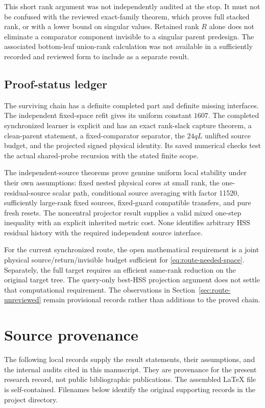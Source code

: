 \documentclass[11pt,oneside,openany,a4paper]{report}
\numberwithin{equation}{chapter}
\theoremstyle{definition}
\theoremstyle{remark}
\begin{document}
This short rank argument was not independently audited at the stop.
It must not be confused with the reviewed exact-family theorem,
which proves full stacked rank, or with a lower bound on singular
values.  Retained rank $R$ alone does not eliminate a comparator
component invisible to a singular parent predesign.  The associated
bottom-leaf union-rank calculation was not available in a sufficiently
recorded and reviewed form to include as a separate result.

\section{Proof-status ledger}

The surviving chain has a definite completed part and definite missing
interfaces.  The independent fixed-space refit gives its uniform
constant $1607$.  The completed synchronized learner is explicit and
has an exact rank-slack capture theorem, a clean-parent statement, a
fixed-comparator separator, the $24qL$ unlifted source budget, and the
projected signed physical identity.  Its saved numerical checks test
the actual shared-probe recursion with the stated finite scope.

The independent-source theorems prove genuine uniform local stability
under their own assumptions: fixed nested physical cores at small
rank, the one-residual-source scalar path, conditional source averaging
with factor 11520, sufficiently large-rank fixed sources, fixed-guard
compatible transfers, and pure fresh resets.  The noncentral projector
result supplies a valid mixed one-step inequality with an explicit
inherited metric cost.  None identifies arbitrary HSS residual history
with the required independent source interface.

For the current synchronized route, the open mathematical requirement
is a joint physical source/return/invisible budget sufficient for
\eqref{eq:route-needed-space}.  Separately, the full target requires an
efficient same-rank reduction on the original target tree.  The
query-only best-HSS projection argument does not settle that
computational requirement.  The observations in
Section~\ref{sec:route-unreviewed} remain provisional records rather
than additions to the proved chain.

\appendix
\chapter{Source provenance}
The following local records supply the result statements, their assumptions,
and the internal audits cited in this manuscript. They are provenance for
the present research record, not public bibliographic publications.
The assembled LaTeX file is self-contained. Filenames below identify the
original supporting records in the project directory.
\end{document}
